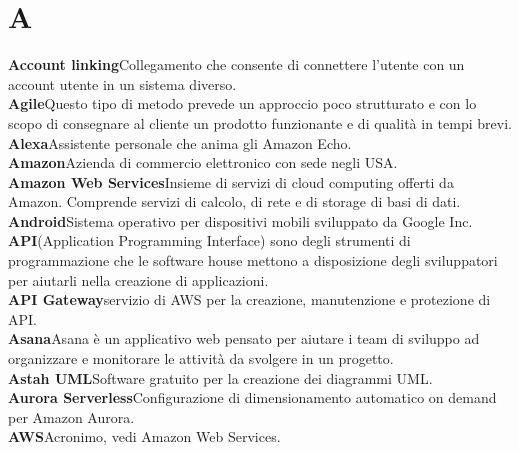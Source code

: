 \newpage
\section{A}\label{l:A}
\textbf{Account linking}\newline Collegamento che consente di connettere l'utente con un account utente in un sistema diverso.\\
\newline
\textbf{Agile}\newline Questo tipo di metodo prevede un approccio poco strutturato e con lo scopo di consegnare al cliente un prodotto funzionante e di qualità in tempi brevi.\\
\newline
\textbf{Alexa}\newline Assistente personale che anima gli Amazon Echo.\\
\newline
\textbf{Amazon}\newline Azienda di commercio elettronico con sede negli USA.\\
\newline
\textbf{Amazon Web Services}\newline Insieme di servizi di cloud computing offerti da Amazon. Comprende servizi di calcolo, di rete e di storage di basi di dati.\\
\newline
\textbf{Android}\newline Sistema operativo per dispositivi mobili sviluppato da Google Inc.\\
\newline
\textbf{API}\newline (Application Programming Interface) sono degli strumenti di programmazione che le software house mettono a disposizione degli sviluppatori per aiutarli nella creazione di applicazioni.\\
\newline
\textbf{API Gateway}\newline servizio di AWS per la creazione, manutenzione e protezione di API.\\
\newline
\textbf{Asana}\newline Asana è un applicativo web pensato per aiutare i team di sviluppo ad organizzare e monitorare le attività da svolgere in un progetto.\\
\newline
\textbf{Astah UML}\newline Software gratuito per la creazione dei diagrammi UML.\\
\newline
\textbf{Aurora Serverless}\newline Configurazione di dimensionamento automatico on demand per Amazon Aurora.\\
\newline
\textbf{AWS}\newline Acronimo, vedi Amazon Web Services.
